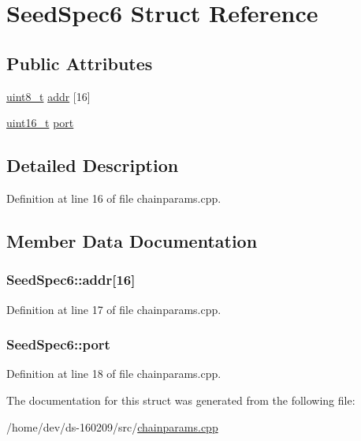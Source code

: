 \hypertarget{struct_seed_spec6}{}\section{Seed\+Spec6 Struct Reference}
\label{struct_seed_spec6}
\subsection*{Public Attributes}
\begin{DoxyCompactItemize}
\item 
\hyperlink{stdint_8h_aba7bc1797add20fe3efdf37ced1182c5}{uint8\+\_\+t} \hyperlink{struct_seed_spec6_ad08d58f6fcd19c2bdb1e24cde0791cbc}{addr} \mbox{[}16\mbox{]}
\item 
\hyperlink{stdint_8h_a273cf69d639a59973b6019625df33e30}{uint16\+\_\+t} \hyperlink{struct_seed_spec6_a48fdfc3ed14e7676b500bab2e2bcc643}{port}
\end{DoxyCompactItemize}


\subsection{Detailed Description}


Definition at line 16 of file chainparams.\+cpp.



\subsection{Member Data Documentation}
\hypertarget{struct_seed_spec6_ad08d58f6fcd19c2bdb1e24cde0791cbc}{}
\subsubsection[{addr}]{ Seed\+Spec6\+::addr\mbox{[}16\mbox{]}}\label{struct_seed_spec6_ad08d58f6fcd19c2bdb1e24cde0791cbc}


Definition at line 17 of file chainparams.\+cpp.

\hypertarget{struct_seed_spec6_a48fdfc3ed14e7676b500bab2e2bcc643}{}
\subsubsection[{port}]{ Seed\+Spec6\+::port}\label{struct_seed_spec6_a48fdfc3ed14e7676b500bab2e2bcc643}


Definition at line 18 of file chainparams.\+cpp.



The documentation for this struct was generated from the following file\+:\begin{DoxyCompactItemize}
\item 
/home/dev/ds-\/160209/src/\hyperlink{chainparams_8cpp}{chainparams.\+cpp}\end{DoxyCompactItemize}
